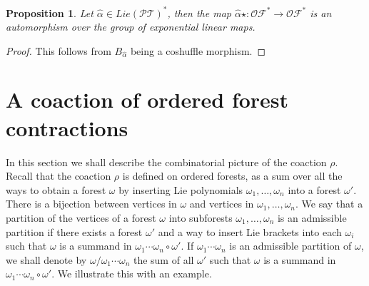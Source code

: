 \documentclass[10pt,a4paper]{article}
\newtheorem{proposition}[theorem]{Proposition}
\begin{document}
\begin{proposition}
Let $\hat{\alpha} \in Lie(\mathcal{PT})^{\ast}$, then the map $\hat{\alpha} \star : \mathcal{OF}^{\ast} \to \mathcal{OF}^{\ast}$ is an automorphism over the group of exponential linear maps.
\end{proposition}
\begin{proof}
This follows from $B_{\hat{\alpha}}$ being a coshuffle morphism.
\end{proof}


\section{A coaction of ordered forest contractions} 
\label{section::4}

In this section we shall describe the combinatorial picture of the coaction $\rho$. \\

Recall that the coaction $\rho$ is defined on ordered forests, as a sum over all the ways to obtain a forest $\omega$ by inserting Lie polynomials $\omega_1, \ldots, \omega_n$ into a forest $\omega'$. There is a bijection between vertices in $\omega$ and vertices in $\omega_1, \ldots, \omega_n$. We say that a partition of the vertices of a forest $\omega$ into subforests $\omega_1, \ldots, \omega_n$ is an admissible partition if there exists a forest $\omega'$ and a way to insert Lie brackets into each $\omega_i$ such that $\omega$ is a summand in $\omega_1 \cdots \omega_n \circ \omega'$. If $\omega_1 \cdots \omega_n$ is an admissible partition of $\omega$, we shall denote by $\omega/\omega_1 \cdots \omega_n$ the sum of all $\omega'$ such that $\omega$ is a summand in $\omega_1 \cdots \omega_n \circ \omega'$. We illustrate this with an example.
\end{document}
